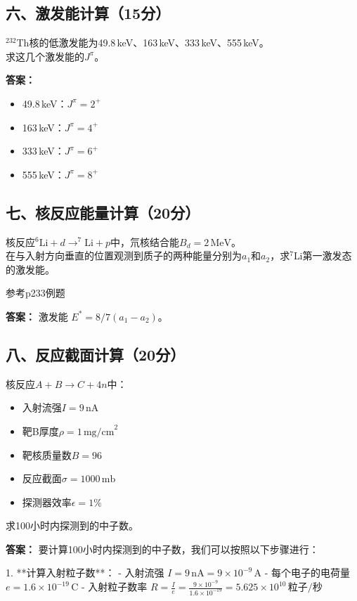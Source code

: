 \documentclass{article}
\begin{document}
\subsection*{六、激发能计算（15分）}
$^{232}$Th核的低激发能为49.8\,keV、163\,keV、333\,keV、555\,keV。\\
求这几个激发能的$J^{\pi}$。

\textbf{答案：}
\begin{itemize}
    \item 49.8\,keV：\( J^\pi = 2^+ \)
    \item 163\,keV：\( J^\pi = 4^+ \)
    \item 333\,keV：\( J^\pi = 6^+ \)
    \item 555\,keV：\( J^\pi = 8^+ \)
\end{itemize}

\subsection*{七、核反应能量计算（20分）}
核反应$ ^6\text{Li} + d \rightarrow ^7\text{Li} + p $中，氘核结合能$B_d = 2\,\text{MeV}$。\\
在与入射方向垂直的位置观测到质子的两种能量分别为$a_1$和$a_2$，求$^7$Li第一激发态的激发能。 

参考p233例题

\textbf{答案：}
激发能 \( E^* = 8/7(a_1 - a_2) \)。

\subsection*{八、反应截面计算（20分）}
核反应$ A + B \rightarrow C + 4n $中：\\
\begin{itemize}
  \item 入射流强$I = 9\,\text{nA}$
  \item 靶B厚度$\rho = 1\,\text{mg/cm}^2$
  \item 靶核质量数$B = 96$
  \item 反应截面$\sigma = 1000\,\text{mb}$
  \item 探测器效率$\epsilon = 1\%$
\end{itemize}
求100小时内探测到的中子数。

\textbf{答案：}
要计算100小时内探测到的中子数，我们可以按照以下步骤进行：

1. **计算入射粒子数**：
   - 入射流强 \( I = 9 \, \text{nA} = 9 \times 10^{-9} \, \text{A} \)
   - 每个电子的电荷量 \( e = 1.6 \times 10^{-19} \, \text{C} \)
   - 入射粒子数率 \( R = \frac{I}{e} = \frac{9 \times 10^{-9}}{1.6 \times 10^{-19}} = 5.625 \times 10^{10} \, \text{粒子/秒} \)
\end{document}
